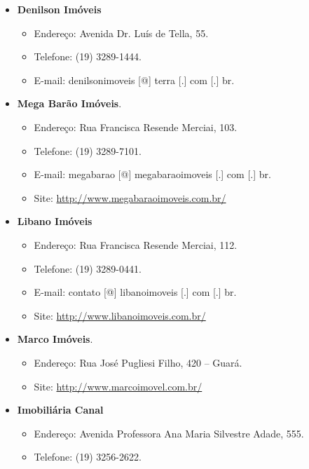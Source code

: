 \begin{itemize}
\item  \textbf{Denilson Imóveis}
\begin{itemize}
\item  Endereço: Avenida Dr. Luís de Tella, 55.
\item  Telefone: (19) 3289-1444.
\item  E-mail: denilsonimoveis [@] terra [.] com [.] br.
\end{itemize}
\end{itemize}

\begin{itemize}
\item  \textbf{Mega Barão Imóveis}.
\begin{itemize}
\item  Endereço: Rua Francisca Resende Merciai, 103.
\item  Telefone: (19) 3289-7101.
\item  E-mail: megabarao [@] megabaraoimoveis [.] com [.] br.
\item  Site: \url{http://www.megabaraoimoveis.com.br/}
\end{itemize}
\end{itemize}

\begin{itemize}
\item  \textbf{Libano Imóveis}
\begin{itemize}
\item  Endereço: Rua Francisca Resende Merciai, 112.
\item  Telefone: (19) 3289-0441.
\item  E-mail: contato [@] libanoimoveis [.] com [.] br.
\item  Site: \url{http://www.libanoimoveis.com.br/}
\end{itemize}
\end{itemize}

\begin{itemize}
\item  \textbf{Marco Imóveis}.
\begin{itemize}
\item  Endereço: Rua José Pugliesi Filho, 420 -- Guará.
\item  Site: \url{http://www.marcoimovel.com.br/}
\end{itemize}
\end{itemize}

\begin{itemize}
\item  \textbf{Imobiliária Canal}
\begin{itemize}
\item  Endereço: Avenida Professora Ana Maria Silvestre Adade, 555.
\item  Telefone: (19) 3256-2622.
\end{itemize}
\end{itemize}

